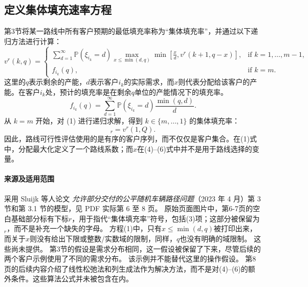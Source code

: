 \documentclass{article}
\begin{document}
\subsection*{定义集体填充速率方程}
第3节将某一路线中所有客户预期的最低填充率称为“集体填充率”，并通过以下递归方法进行计算：
\begin{equation}
v^r(k,q)=
\begin{cases}
\displaystyle\sum_{d=1}^{\infty}\mathbb P(\xi_{i_k}=d)
\max_{x\le\min(d,q)}
\min\!\left[\frac{x}{d},v^r(k+1,q-x)\right],
&\text{if }k=1,\ldots,m-1,\\[6pt]
f_{i_k}(q),&\text{if }k=m.
\end{cases}
\tag{1}
\end{equation}
这里的$q$表示剩余的产能，$d$表示客户$i_k$的实际需求，而$x$则代表分配给该客户的产能。在客户$i_k$处，预计的填充率是在剩余$q$单位的产能情况下的填充率。
\begin{equation}
f_{i_k}(q)=\sum_{d=1}^{\infty}\mathbb P(\xi_{i_k}=d)
\frac{\min(q,d)}{d}. \tag{2}
\end{equation}
从 $k=m$ 开始，对 (1) 进行递归求解，得到 $k\in\{m,\ldots,1\}$ 的集体填充率：
\[
{}_r=v^r(1,Q).
\]
因此，路线可行性评估使用的是有序的客户序列，而不仅仅是客户集合。在(1)式中，分配最大化定义了一个路线系数；而$x$在(4)--(6)式中并不是用于路线选择的变量。

\paragraph{来源及适用范围}
采用 Sluijk 等人论文 \emph{允许部分交付的公平随机车辆路径问题}（2023 年 4 月）第 3 节和第 3.1 节的模型，见 PDF 实际第 6 至 8 页。 原始页面图片中，第6-7页的空白基础部分标有下标$r$，用于指代“集体填充率”符号，包括(3)项；这部分被保留为${}_r$，而不是补充一个缺失的字母。 方程(1)中，只有$x\le\min(d,q)$被打印出来，而关于$x$则没有给出下限或整数/实数域的限制，同样，$q$也没有明确的域限制。 这些尚未提供。 第3节的假设是需求分布相同，这一假设被保留了下来，尽管后续的两个客户示例使用了不同的需求分布。 该示例并不能替代这里的操作假设。 第8页的后续内容介绍了线性松弛法和列生成法作为解决方法，而不是对(4)--(6)的额外条件。这些算法公式并未被包含在内。
\end{document}
